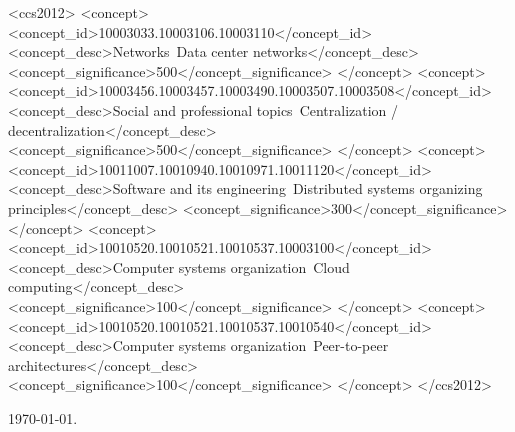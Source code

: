 \documentclass[sigchi-a, authorversion]{acmart}
\begin{document}
%
%
\begin{CCSXML}
<ccs2012>
 <concept>
 <concept_id>10003033.10003106.10003110</concept_id>
 <concept_desc>Networks~Data center networks</concept_desc>
 <concept_significance>500</concept_significance>
 </concept>
 <concept>
 <concept_id>10003456.10003457.10003490.10003507.10003508</concept_id>
 <concept_desc>Social and professional topics~Centralization / decentralization</concept_desc>
 <concept_significance>500</concept_significance>
 </concept>
 <concept>
 <concept_id>10011007.10010940.10010971.10011120</concept_id>
 <concept_desc>Software and its engineering~Distributed systems organizing principles</concept_desc>
 <concept_significance>300</concept_significance>
 </concept>
 <concept>
 <concept_id>10010520.10010521.10010537.10003100</concept_id>
 <concept_desc>Computer systems organization~Cloud computing</concept_desc>
 <concept_significance>100</concept_significance>
 </concept>
 <concept>
 <concept_id>10010520.10010521.10010537.10010540</concept_id>
 <concept_desc>Computer systems organization~Peer-to-peer architectures</concept_desc>
 <concept_significance>100</concept_significance>
 </concept>
</ccs2012>
\end{CCSXML}


\today.
  
\end{document}
